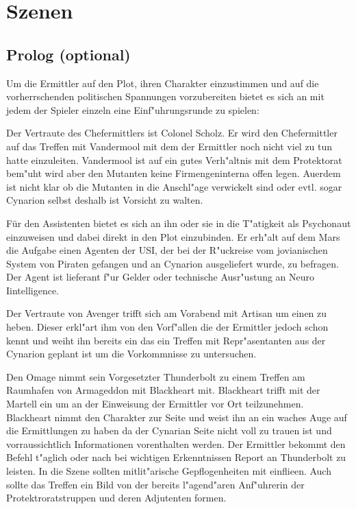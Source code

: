\section{Szenen}

\subsection{Prolog (optional)}

Um die Ermittler auf den Plot, ihren Charakter einzustimmen und auf die vorherrschenden politischen Spannungen vorzubereiten bietet es sich an mit jedem der Spieler einzeln eine Einf"uhrungsrunde zu spielen:

Der Vertraute des Chefermittlers ist Colonel Scholz. Er wird den Chefermittler auf das Treffen mit Vandermool mit dem der Ermittler noch nicht viel zu tun hatte einzuleiten. Vandermool ist auf ein gutes Verh"altnis mit dem Protektorat bem"uht wird aber den Mutanten keine Firmengeninterna offen legen. Au\3erdem ist nicht klar ob die Mutanten in die Anschl"age verwickelt sind oder evtl. sogar Cynarion selbst deshalb ist Vorsicht zu walten.

Für den Assistenten bietet es sich an ihn oder sie in die T"atigkeit als Psychonaut einzuweisen und dabei direkt in den Plot einzubinden. Er erh"alt auf dem Mars die Aufgabe einen Agenten der USI, der bei der R"uckreise vom jovianischen System von Piraten gefangen und an Cynarion ausgeliefert wurde, zu befragen. Der Agent ist lieferant f"ur Gelder oder technische Ausr"ustung an Neuro Iintelligence.

Der Vertraute von Avenger trifft sich am Vorabend mit Artisan um einen zu heben. Dieser erkl"art ihm von den Vorf"allen die der Ermittler jedoch schon kennt und weiht ihn bereits ein das ein Treffen mit Repr"asentanten aus der Cynarion geplant ist um die Vorkommnisse zu untersuchen.

Den Omage nimmt sein Vorgesetzter Thunderbolt zu einem Treffen am Raumhafen von Armageddon mit Blackheart mit. Blackheart trifft mit der Martell ein um an der Einweisung der Ermittler vor Ort teilzunehmen. Blackheart nimmt den Charakter zur Seite und weist ihn an ein waches Auge auf die Ermittlungen zu haben da der Cynarian Seite nicht voll zu trauen ist und vorraussichtlich Informationen vorenthalten werden.
Der Ermittler bekommt den Befehl t"aglich oder nach bei wichtigen Erkenntnissen Report an Thunderbolt zu leisten. In die Szene sollten mitlit"arische Gepflogenheiten mit einflie\3en. Auch sollte das Treffen ein Bild von der bereits l"agend"aren Anf"uhrerin der Protektroratstruppen und deren Adjutenten formen.

